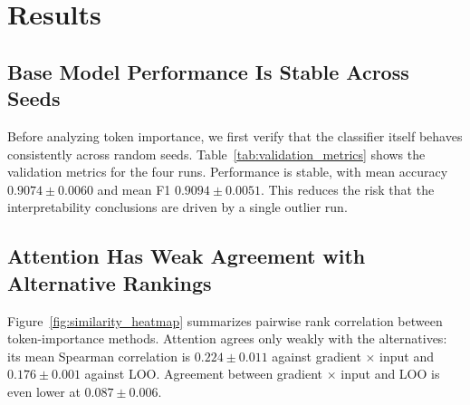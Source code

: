 \section{Results}
\label{sec:results}

\subsection{Base Model Performance Is Stable Across Seeds}

Before analyzing token importance, we first verify that the classifier itself behaves consistently across random seeds. Table~\ref{tab:validation_metrics} shows the validation metrics for the four runs. Performance is stable, with mean accuracy $0.9074 \pm 0.0060$ and mean F1 $0.9094 \pm 0.0051$. This reduces the risk that the interpretability conclusions are driven by a single outlier run.

\begin{table}[t]
\centering
{
\footnotesize
\setlength{\tabcolsep}{4pt}
}
\caption{Validation performance on SST-2 across four random seeds. All $\pm$ values report sample standard deviation ($n-1$ denominator).}
\label{tab:validation_metrics}
\end{table}

\subsection{Attention Has Weak Agreement with Alternative Rankings}

Figure~\ref{fig:similarity_heatmap} summarizes pairwise rank correlation between token-importance methods. Attention agrees only weakly with the alternatives: its mean Spearman correlation is $0.224 \pm 0.011$ against gradient $\times$ input and $0.176 \pm 0.001$ against LOO. Agreement between gradient $\times$ input and LOO is even lower at $0.087 \pm 0.006$.

